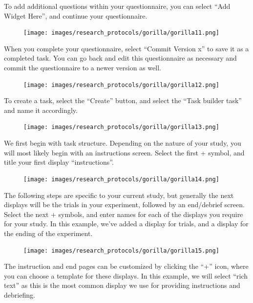 \documentclass[
]{book}
\begin{document}
To add additional questions within your questionnaire, you can select ``Add Widget Here'', and continue your questionnaire.

\begin{figure}
\centering
\texttt{[image: images/research\_protocols/gorilla/gorilla11.png]}
\caption{}
\end{figure}

When you complete your questionnaire, select ``Commit Version x'' to save it as a completed task. You can go back and edit this questionnaire as necessary and commit the questionnaire to a newer version as well.

\begin{figure}
\centering
\texttt{[image: images/research\_protocols/gorilla/gorilla12.png]}
\caption{}
\end{figure}

To create a task, select the ``Create'' button, and select the ``Task builder task'' and name it accordingly.

\begin{figure}
\centering
\texttt{[image: images/research\_protocols/gorilla/gorilla13.png]}
\caption{}
\end{figure}

We first begin with task structure. Depending on the nature of your study, you will most likely begin with an instructions screen. Select the first + symbol, and title your first display ``instructions''.

\begin{figure}
\centering
\texttt{[image: images/research\_protocols/gorilla/gorilla14.png]}
\caption{}
\end{figure}

The following steps are specific to your current study, but generally the next displays will be the trials in your experiment, followed by an end/debrief screen. Select the next + symbols, and enter names for each of the displays you require for your study. In this example, we've added a display for trials, and a display for the ending of the experiment.

\begin{figure}
\centering
\texttt{[image: images/research\_protocols/gorilla/gorilla15.png]}
\caption{}
\end{figure}

The instruction and end pages can be customized by clicking the ``+'' icon, where you can choose a template for these displays. In this example, we will select ``rich text'' as this is the most common display we use for providing instructions and debriefing.
\end{document}
